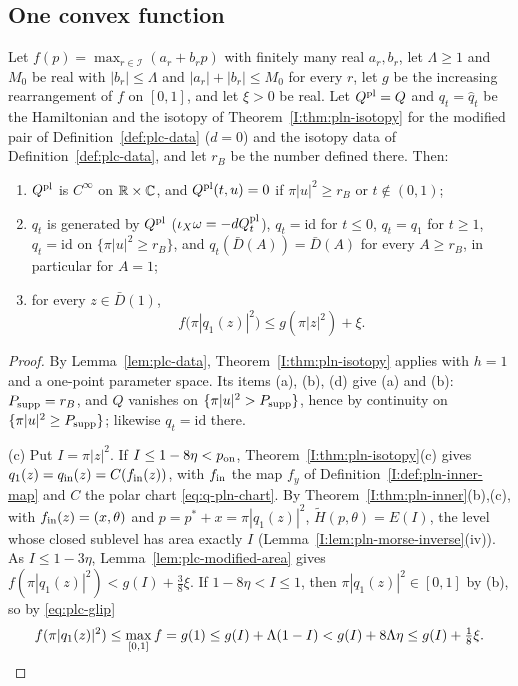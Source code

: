 \subsection{One convex function}\label{sec:plc-planar}

\begin{theorem}\label{thm:plc-planar}
Let $f(p)=\max_{r\in\mathcal I}(a_r+b_rp)$ with finitely many real $a_r,b_r$, let $\Lambda\ge1$ and $M_0$ be real with $|b_r|\le\Lambda$
and $|a_r|+|b_r|\le M_0$ for every $r$, let $g$ be the increasing rearrangement of $f$ on $[0,1]$, and let $\xi>0$ be real. Let
$Q^{\rm pl}=Q$ and $q_t=\hat q_t$ be the Hamiltonian and the isotopy of Theorem~\ref{I:thm:pln-isotopy} for the
modified pair of Definition~\ref{def:plc-data} ($d=0$) and the isotopy data of Definition~\ref{def:plc-data}, and let $r_B$ be
the number defined there. Then:
\begin{enumerate}[label=(\alph*)]
\item $Q^{\rm pl}$ is $C^\infty$ on $\mathbb{R}\times\mathbb{C}$, and $Q^{\rm pl}(t,u)=0$ if $\pi|u|^2\ge r_B$ or $t\notin(0,1)$;
\item $q_t$ is generated by $Q^{\rm pl}$ ($\iota_X\omega=-dQ^{\rm pl}_t$), $q_t=\mathrm{id}$ for $t\le0$, $q_t=q_1$ for $t\ge1$,
 $q_t=\mathrm{id}$ on $\{\pi|u|^2\ge r_B\}$, and $q_t(\bar D(A))=\bar D(A)$ for every $A\ge r_B$, in particular for $A=1$;
\item for every $z\in\bar D(1)$,
 \[
  f\bigl(\pi|q_1(z)|^2\bigr)\le g(\pi|z|^2)+\xi .
 \]
\end{enumerate}
\end{theorem}

\begin{proof}
By Lemma~\ref{lem:plc-data}, Theorem~\ref{I:thm:pln-isotopy} applies with $h=1$ and a one-point parameter space. Its
items (a), (b), (d) give (a) and (b): $P_{\rm supp}=r_B$, and $Q$ vanishes on $\{\pi|u|^2>P_{\rm supp}\}$, hence by
continuity on $\{\pi|u|^2\ge P_{\rm supp}\}$; likewise $q_t=\mathrm{id}$ there.

(c) Put $I=\pi|z|^2$. If $I\le1-8\eta<p_{\rm on}$, Theorem~\ref{I:thm:pln-isotopy}(c) gives $q_1(z)=q_{\rm in}(z)=C(f_{\rm in}(z))$,
with $f_{\rm in}$ the map $f_y$ of Definition~\ref{I:def:pln-inner-map} and $C$ the polar chart \eqref{eq:q-pln-chart}. By
Theorem~\ref{I:thm:pln-inner}(b),(c), with $f_{\rm in}(z)=(x,\theta)$ and $p=p^*+x=\pi|q_1(z)|^2$, $\widetilde H(p,\theta)=E(I)$, the
level whose closed sublevel has area exactly $I$ (Lemma~\ref{I:lem:pln-morse-inverse}(iv)). As $I\le1-3\eta$,
Lemma~\ref{lem:plc-modified-area} gives $f(\pi|q_1(z)|^2)<g(I)+\frac38\xi$. If $1-8\eta<I\le1$, then $\pi|q_1(z)|^2\in[0,1]$ by (b), so by \eqref{eq:plc-glip}
\[
 f(\pi|q_1(z)|^2)\le\max_{[0,1]}f=g(1)\le g(I)+\Lambda(1-I)<g(I)+8\Lambda\eta\le g(I)+\tfrac18\xi .\qedhere
\]
\end{proof}

